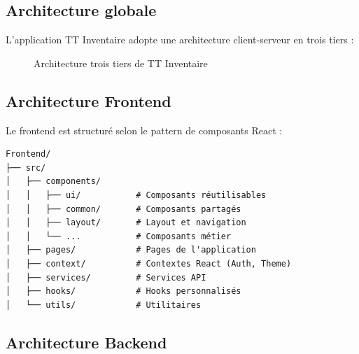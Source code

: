 \documentclass[12pt,a4paper]{report}
\begin{document}
\subsection{Architecture globale}

L'application TT Inventaire adopte une architecture client-serveur en trois tiers :

\begin{figure}[H]
\centering
{}
\caption{Architecture trois tiers de TT Inventaire}
\end{figure}

\subsection{Architecture Frontend}

Le frontend est structuré selon le pattern de composants React :

\begin{verbatim}
Frontend/
├── src/
│   ├── components/
│   │   ├── ui/           # Composants réutilisables
│   │   ├── common/       # Composants partagés
│   │   ├── layout/       # Layout et navigation
│   │   └── ...           # Composants métier
│   ├── pages/            # Pages de l'application
│   ├── context/          # Contextes React (Auth, Theme)
│   ├── services/         # Services API
│   ├── hooks/            # Hooks personnalisés
│   └── utils/            # Utilitaires
\end{verbatim}

\subsection{Architecture Backend}
\end{document}

